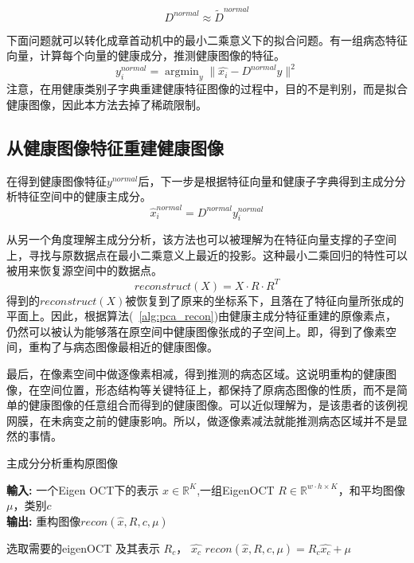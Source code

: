     \begin{equation}
        D^{normal} \approx \tilde{D}^{normal}
    \end{equation}

    下面问题就可以转化成章首动机中的最小二乘意义下的拟合问题。有一组病态特征向量，计算每个向量的健康成分，推测健康图像的特征。
    \begin{equation}
        y_i^{normal} = \mathop{\arg \min} _{y} \|\hat{x_i} - D^{normal} y\| ^ 2 
    \end{equation}
    注意，在用健康类别子字典重建健康特征图像的过程中，目的不是判别，而是拟合健康图像，因此本方法去掉了稀疏限制。
    


    \subsection{从健康图像特征重建健康图像}
    在得到健康图像特征$y^{normal}$后，下一步是根据特征向量和健康子字典得到主成分分析特征空间中的健康主成分。
    \begin{equation}
        \hat{x}_i^{normal} = D^{normal} y_i^{normal}
    \end{equation}

    从另一个角度理解主成分分析，该方法也可以被理解为在特征向量支撑的子空间上，寻找与原数据点在最小二乘意义上最近的投影。这种最小二乘回归的特性可以被用来恢复源空间中的数据点。
    \begin{equation}
        reconstruct(X) = X \cdot R \cdot R^T        
    \end{equation}
    得到的$reconstruct(X)$被恢复到了原来的坐标系下，且落在了特征向量所张成的平面上。因此，根据算法(~\ref{alg:pca_recon})由健康主成分特征重建的原像素点，仍然可以被认为能够落在原空间中健康图像张成的子空间上。即，得到了像素空间，重构了与病态图像最相近的健康图像。

    最后，在像素空间中做逐像素相减，得到推测的病态区域。这说明重构的健康图像，在空间位置，形态结构等关键特征上，都保持了原病态图像的性质，而不是简单的健康图像的任意组合而得到的健康图像。可以近似理解为，是该患者的该例视网膜，在未病变之前的健康影响。所以，做逐像素减法就能推测病态区域并不是显然的事情。

    \begin{algorithm}[h]
        \caption{主成分分析重构原图像} %
        \hspace*{0.02in} {\bf 輸入:} %
        一个Eigen OCT下的表示 $\hat{x} \in \mathbb{R} ^{K} $,一组EigenOCT $R \in \mathbb{R} ^{w\cdot h \times K}$，和平均图像$\mu$，类别$c$\\
        \hspace*{0.02in} {\bf 输出:} %
        重构图像$recon(\hat{x}, R, c, \mu)$
        \begin{algorithmic}[1]
            \State 选取需要的eigenOCT 及其表示 $R_c$， $\hat{x_c}$
            \State $recon(\hat{x}, R, c, \mu) = R_c \hat{x_c} + \mu$
        \end{algorithmic}
        \label{alg:pca_recon}
    \end {algorithm}

